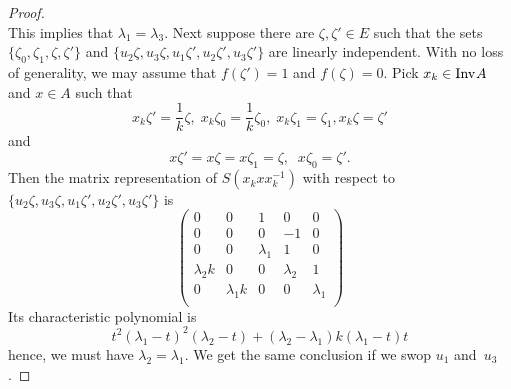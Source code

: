 \documentclass[a4paper,12pt,reqno]{amsart}
\numberwithin{equation}{section}
\theoremstyle{definition}
\begin{document}
\begin{proof}
\[\]
This implies that  $\lambda_1= \lambda_3$.
Next suppose there are $\zeta, \zeta'\in E$ such that the sets $\{\zeta_0,\zeta_1,\zeta,\zeta'\}$ and
$\{ u_2 \zeta, u_3 \zeta, u_1 \zeta', u_2 \zeta', u_3 \zeta'\}$ are linearly independent.  With no loss of generality,
we may assume that $f(\zeta')=1$ and $f(\zeta)=0$. Pick  $x_k \in{{\textup{Inv}\kern.5pt A}}$ and $x \in A$ such that
\[
x_k \zeta'= \frac{1}{k}\zeta, \; x_k \zeta_0= \frac{1}{k}\zeta_0, \; x_k \zeta_1= \zeta_1, x_k \zeta= \zeta'
\]
and
\[
x \zeta'= x \zeta= x \zeta_1= \zeta, \;\; x \zeta_0= \zeta'.
\]
Then the matrix representation of ${S} (x_k^{}x x_k^{-1})$ with respect to $\{ u_2 \zeta, u_3 \zeta, u_1 \zeta', u_2 \zeta', u_3 \zeta'\}$ is
\[
\left(
  \begin{array}{ccccc}
    0 & 0 & 1 & 0 & 0 \\
    0 & 0 & 0 & -1 & 0 \\
    0 & 0 & \lambda_1 & 1 & 0 \\
    \lambda_2 k & 0 & 0 & \lambda_2 & 1 \\
    0& \lambda_1 k & 0 & 0 & \lambda_1\\
  \end{array}
\right)
\]
Its characteristic polynomial is
\begin{equation*}
t^2 (\lambda_1-t)^2 (\lambda_2-t)+(\lambda_2- \lambda_1)k(\lambda_1-t) t
\end{equation*}
hence, we must have $\lambda_2= \lambda_1$. We get the same conclusion if we swop $u_1$ and~$u_3$.


\end{proof}
\end{document}
